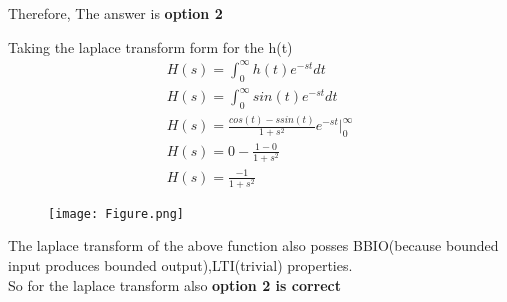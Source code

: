 \documentclass[journal,12pt,twocolumn]{IEEEtran}
\begin{document}
 Therefore, The answer is \textbf{option 2}
 
Taking the laplace transform form for the h(t)
\begin{align}
    H(s)= \int_{0}^{\infty} h(t) e^{-st} dt\\
    H(s)= \int_{0}^{\infty} sin(t) e^{-st} dt \\
    H(s)= \frac{cos(t)-ssin(t)}{1+s^2} e^{-st} \bigg\rvert^{\infty}_{0}\\
    H(s) = 0 - \frac{1-0}{1+s^2}\\
    H(s) = \frac{-1}{1+s^2}
\end{align}
\begin{figure}[htp]
    \centering
    \texttt{[image: Figure.png]}
    \label{fig:my_label}
\end{figure}
The laplace transform of the above function also posses BBIO(because bounded input produces bounded output),LTI(trivial) properties.\\
So for the laplace transform also \textbf{option 2 is correct}
\end{document}
